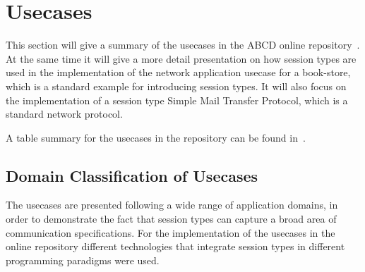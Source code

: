 \section{Usecases}
\label{sec:usecases}

This section will give a summary of the usecases in
the ABCD online repository~\cite{usecase_repository}. At the
same time it will give a more detail presentation on
how session types are used in the implementation of the network application
usecase for a book-store, which is a standard example for introducing
session types. It will also focus on the implementation of a session type
Simple Mail Transfer Protocol, which is a standard network protocol.



A table summary for the usecases in the repository can be
found in~.

\subsection{Domain Classification of Usecases}

The usecases are presented following a wide range of
application domains, in order to demonstrate the fact that
session types can capture
a broad area of communication specifications. 
For the implementation of the usecases in the online
repository different technologies that integrate
session types in different programming paradigms were used.


